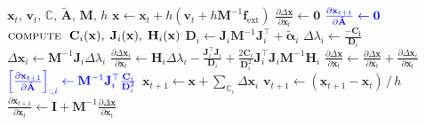 \documentclass{article}
\newcommand{\pdc}[2]{\frac{\partial #1}{\partial #2}}
\newcommand{\blue}[1]{\textcolor{blue}{#1}}
\begin{document}
\begin{algorithm}[H]
\caption{Differentiated XPBD Time Step with 1 Iteration}
\label{alg:diffXPBD_1iteration}
\begin{algorithmic}[1]
\addtolength{\itemsep}{0.5ex}
{$\mathbf{x}_t,\, \mathbf{v}_t,\, 
\mathbb{C},\, \tilde{\mathbf{A}},\, \mathbf{M},\, h$}
    \State $\mathbf{x} \gets \mathbf{x}_t + h(\mathbf{v}_t + h\mathbf{M}^{-1}\mathbf{f}_{\text{ext}})$
    \State $\pdc{\Delta \mathbf{x}}{\mathbf{x}_t} \gets \mathbf{0}$
    \State $\blue{\pdc{\mathbf{x}_{t+1}}{\tilde{\mathbf{A}}} \gets \mathbf{0}}$
        \State $\textsc{compute }\; \mathbf{C}_i(\mathbf{x}),\; \mathbf{J}_i(\mathbf{x}), \; \mathbf{H}_i(\mathbf{x})$
        \State $\mathbf{D}_i \gets  \mathbf{J}_i\mathbf{M}^{-1}\mathbf{J}_i^\top + \tilde{\boldsymbol{\alpha}}_i$ 
        \State $\Delta \lambda_i \gets \frac{-\mathbf{C_i}}{\mathbf{D}_i}$
        \State $\Delta \mathbf{x}_i \gets \mathbf{M}^{-1}\mathbf{J}_i\Delta \lambda_i$
        \State $\pdc{\Delta \mathbf{x}_i}{\mathbf{x}_t} \gets
        \mathbf{H}_i\Delta\lambda_i - 
        \frac{ \mathbf{J}_i^\top\mathbf{J}_i}{\mathbf{D}_i} + \frac{2\mathbf{C}_i}{\mathbf{D}_i^{2}} \mathbf{J}_i^\top\mathbf{J}_i\mathbf{M}^{-1}\mathbf{H}_i$
        \State $\pdc{\Delta \mathbf{x}}{\mathbf{x}_t} \gets \pdc{\Delta \mathbf{x}}{\mathbf{x}_t} + \pdc{\Delta \mathbf{x}_i}{\mathbf{x}_t}$
        \State $\blue{\left[\pdc{\mathbf{x}_{t+1}}{\tilde{\mathbf{A}}}\right]_{:,i} \gets \mathbf{M}^{-1}\mathbf{J}_i^\top \frac{\mathbf{C}_i}{\mathbf{D}_i^{2}}}$
    \EndFor
    \State $\mathbf{x}_{t+1} \gets \mathbf{x} + \sum_{\mathbb{C}_i}\Delta \mathbf{x}_i$
    \State $\mathbf{v}_{t+1} \gets (\mathbf{x}_{t+1} - \mathbf{x}_t) \,/\, h$
    \State $\pdc{\mathbf{x}_{t+1}}{\mathbf{x}_t} \gets \mathbf{I} + \mathbf{M}^{-1}\pdc{\Delta \mathbf{x}}{\mathbf{x}_t}$
\EndFunction
\end{algorithmic}
\end{algorithm}
\end{document}
